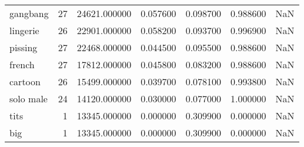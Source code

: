 \begin{tabular}{lrrrrrr}
gangbang & 27 & 24621.000000 & 0.057600 & 0.098700 & 0.988600 & NaN \\
lingerie & 26 & 22901.000000 & 0.058200 & 0.093700 & 0.996900 & NaN \\
pissing & 27 & 22468.000000 & 0.044500 & 0.095500 & 0.988600 & NaN \\
french & 27 & 17812.000000 & 0.045800 & 0.083200 & 0.988600 & NaN \\
cartoon & 26 & 15499.000000 & 0.039700 & 0.078100 & 0.993800 & NaN \\
solo male & 24 & 14120.000000 & 0.030000 & 0.077000 & 1.000000 & NaN \\
tits & 1 & 13345.000000 & 0.000000 & 0.309900 & 0.000000 & NaN \\
big & 1 & 13345.000000 & 0.000000 & 0.309900 & 0.000000 & NaN \\
\bottomrule
\end{tabular}
